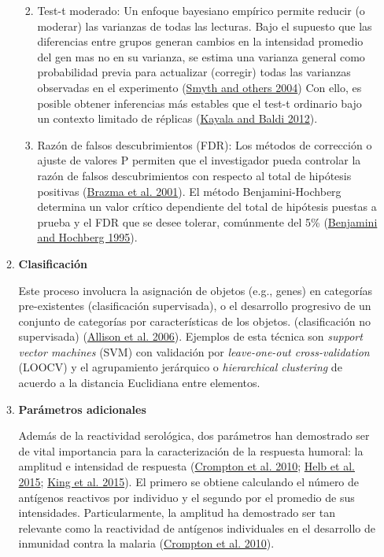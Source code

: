 \documentclass[
  a4paper]{article}
\providecommand{\tightlist}{%
  \setlength{\itemsep}{0pt}\setlength{\parskip}{0pt}}
\begin{document}
\begin{enumerate}
\begin{enumerate}
    \begin{enumerate}
    \def\labelenumiii{\arabic{enumiii}.}
    \tightlist
    \item
      Test-t moderado: Un enfoque bayesiano empírico permite reducir (o
      moderar) las varianzas de todas las lecturas. Bajo el supuesto que
      las diferencias entre grupos generan cambios en la intensidad
      promedio del gen mas no en su varianza, se estima una varianza
      general como probabilidad previa para actualizar (corregir) todas
      las varianzas observadas en el experimento
      (\protect\hyperlink{ref-smyth2004ebayes}{Smyth and others 2004})
      Con ello, es posible obtener inferencias más estables que el
      test-t ordinario bajo un contexto limitado de réplicas
      (\protect\hyperlink{ref-kayala2012cyber}{Kayala and Baldi 2012}).
    \item
      Razón de falsos descubrimientos (FDR): Los métodos de corrección o
      ajuste de valores P permiten que el investigador pueda controlar
      la razón de falsos descubrimientos con respecto al total de
      hipótesis positivas (\protect\hyperlink{ref-brazma2001}{Brazma et
      al. 2001}). El método Benjamini-Hochberg determina un valor
      crítico dependiente del total de hipótesis puestas a prueba y el
      FDR que se desee tolerar, comúnmente del 5\%
      (\protect\hyperlink{ref-benjamini1995fdr}{Benjamini and Hochberg
      1995}).
    \end{enumerate}
  \item
    \textbf{Clasificación}

    Este proceso involucra la asignación de objetos (e.g., genes) en
    categorías pre-existentes (clasificación supervisada), o el
    desarrollo progresivo de un conjunto de categorías por
    características de los objetos. (clasificación no supervisada)
    (\protect\hyperlink{ref-allison2006}{Allison et al. 2006}). Ejemplos
    de esta técnica son \emph{support vector machines} (SVM) con
    validación por \emph{leave-one-out cross-validation} (LOOCV) y el
    agrupamiento jerárquico o \emph{hierarchical clustering} de acuerdo
    a la distancia Euclidiana entre elementos.
  \item
    \textbf{Parámetros adicionales}

    Además de la reactividad serológica, dos parámetros han demostrado
    ser de vital importancia para la caracterización de la respuesta
    humoral: la amplitud e intensidad de respuesta
    (\protect\hyperlink{ref-crompton2010}{Crompton et al. 2010};
    \protect\hyperlink{ref-Helb2015exposure}{Helb et al. 2015};
    \protect\hyperlink{ref-King2015FOC}{King et al. 2015}). El primero
    se obtiene calculando el número de antígenos reactivos por individuo
    y el segundo por el promedio de sus intensidades. Particularmente,
    la amplitud ha demostrado ser tan relevante como la reactividad de
    antígenos individuales en el desarrollo de inmunidad contra la
    malaria (\protect\hyperlink{ref-crompton2010}{Crompton et al.
    2010}).
  \end{enumerate}
\end{enumerate}
\end{document}
